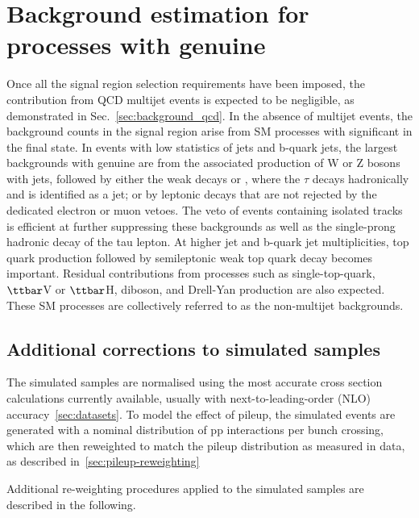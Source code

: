 
\section{Background estimation for processes with genuine \met}
\label{sec:backgroundmet}

Once all the signal region selection requirements have been imposed,
the contribution from QCD multijet events is expected to be
negligible, as demonstrated in Sec.~\ref{sec:background_qcd}. 
In the absence of multijet events, the background counts in the signal region arise from
SM processes with significant \met in the final state. In events with
low statistics of jets and b-quark jets, the largest backgrounds with
genuine \met are from the associated production of W or Z bosons with
jets, followed by either the weak decays \znunu or \wtaunu, where the
$\tau$ decays hadronically and is identified as a jet; or by leptonic
decays that are not rejected by the dedicated electron or muon
vetoes. The veto of events containing isolated tracks is efficient at
further suppressing these backgrounds as well as the single-prong
hadronic decay of the tau lepton. At higher jet and b-quark jet
multiplicities, top quark production followed by semileptonic weak top
quark decay becomes important.  Residual contributions from processes
such as single-top-quark, $\ttbar$V or $\ttbar$H, diboson, and
Drell-Yan production are also expected. These SM processes are
collectively referred to as the non-multijet backgrounds.

\subsection{Additional corrections to simulated samples}
\label{sec:mc-corrections}

The simulated samples are normalised using the most accurate cross
section calculations currently available, usually with
next-to-leading-order (NLO) accuracy~\ref{sec:datasets}. 
To model the effect of pileup, the simulated events are generated with a nominal distribution
of pp interactions per bunch crossing, which are then reweighted
to match the pileup distribution as measured in data, as described in~\ref{sec:pileup-reweighting}

Additional re-weighting procedures applied to the simulated samples are described in the following.

